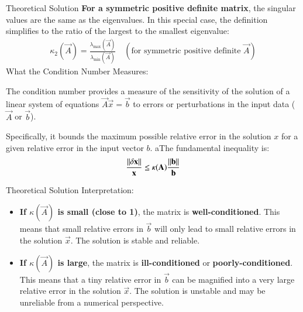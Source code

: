 \documentclass{beamer}
\begin{document}
\begin{frame}{Theoretical Solution}
\textbf{For a symmetric positive definite matrix}, the singular values are the same as the eigenvalues. In this special case, the definition simplifies to the ratio of the largest to the smallest eigenvalue:
\begin{align}
\kappa_2(\vec{A}) = \frac{\lambda_{\text{max}}(\vec{A})}{\lambda_{\text{min}}(\vec{A})} \quad (\text{for symmetric positive definite } \vec{A})
\end{align}
What the Condition Number Measures:

The condition number provides a measure of the sensitivity of the solution of a linear system of equations $\vec{A}\vec{x} = \vec{b}$ to errors or perturbations in the input data ($\vec{A}$ or $\vec{b}$).

Specifically, it bounds the maximum possible relative error in the solution $x$ for a given relative error in the input vector $b$. aThe fundamental inequality is:
\begin{align}
\frac{\left\lVert\delta \mathbf{x}\right\rVert}{\mathbf{x}} \le \kappa(\mathbf{A}) \frac{\left\lVert\mathbf{b}\right\rVert}{\mathbf{b}}
\end{align}
\end{frame}

\begin{frame}{Theoretical Solution}
Interpretation:
\begin{itemize}
    \item \textbf{If $\kappa(\vec{A})$ is small (close to 1)}, the matrix is \textbf{well-conditioned}. This means that small relative errors in $\vec{b}$ will only lead to small relative errors in the solution $\vec{x}$. The solution is stable and reliable.
    \item \textbf{If $\kappa(\vec{A})$ is large}, the matrix is \textbf{ill-conditioned} or \textbf{poorly-conditioned}. This means that a tiny relative error in $\vec{b}$ can be magnified into a very large relative error in the solution $\vec{x}$. The solution is unstable and may be unreliable from a numerical perspective.
\end{itemize}\\

\bigskip
\end{frame}
\end{document}
